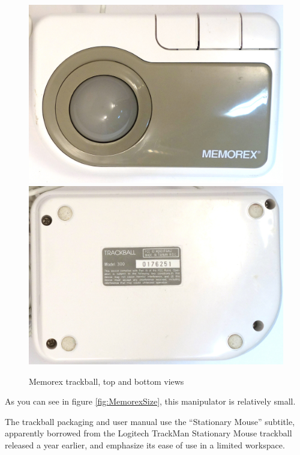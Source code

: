 \documentclass[11pt, a4paper]{article}
\begin{document}
\begin{figure}[h]
    \centering
    \includegraphics[scale=0.5]{1994_memorex_trackball/top_30.jpg}
    \includegraphics[scale=0.5]{1994_memorex_trackball/bottom_30.jpg}
    \caption{Memorex trackball, top and bottom views}
    \label{fig:MemorexTopBottom}
\end{figure}

As you can see in figure \ref{fig:MemorexSize}, this manipulator is relatively small.

The trackball packaging and user manual use the “Stationary Mouse” subtitle, apparently borrowed from the Logitech TrackMan Stationary Mouse trackball released a year earlier, and emphasize its ease of use in a limited workspace.
\end{document}
